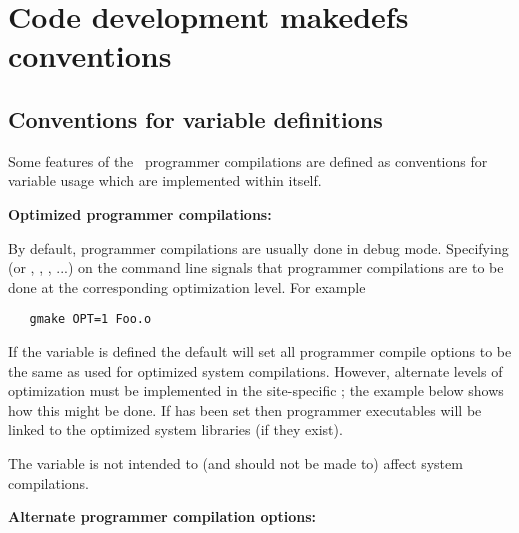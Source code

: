  
\newpage
\section{Code development makedefs conventions}
\label{Code development makedefs conventions}

\subsection*{Conventions for  variable definitions}
 
Some features of the \aipspp\ programmer compilations are defined as
conventions for variable usage which are implemented within 
itself.
 
\textbf{Optimized programmer compilations:}
 
By default, programmer compilations are usually done in debug mode.
Specifying  (or , , , ...) on the
 command line signals that programmer compilations are to be
done at the corresponding optimization level.  For example
 
\begin{verbatim}
   gmake OPT=1 Foo.o
\end{verbatim}
 
\noindent
If the  variable is defined the default  will set
all programmer compile options to be the same as used for optimized system
compilations.  However, alternate levels of optimization must be implemented
in the site-specific ; the example below shows how this might
be done.  If  has been set then programmer executables will be
linked to the optimized system libraries (if they exist).
 
The  variable is not intended to (and should not be made to) affect
system compilations.
 
\textbf{Alternate programmer compilation options:}
 
